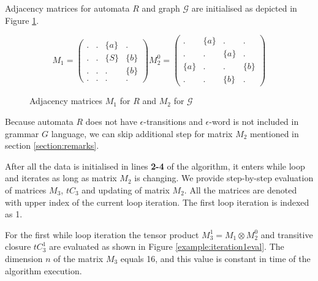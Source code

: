 Adjacency matrices for automata $R$ and graph $\mathcal{G}$ are initialised as depicted in Figure \ref{example:init}.

\begin{figure}
    \centering
    $$
    M_1 =
    \begin{pmatrix}
    . & . & \{a\} & .     \\
    . & . & \{S\} & \{b\} \\
    . & . & . & \{b\}     \\
    . & . & . & . 
    \end{pmatrix}
    M_2^0 =
    \begin{pmatrix}
    . & \{a\} & . & .     \\
    . & . & \{a\} & .     \\
    \{a\} & . & . & \{b\} \\
    . & . & \{b\} & . 
    \end{pmatrix}
    $$
    \caption{Adjacency matrices $M_1$ for $R$ and $M_2$ for $\mathcal{G}$}
    \label{example:init}
\end{figure}

Because automata $R$ does not have $\epsilon$-transitions and $\epsilon$-word is not included in grammar $G$ language, we can skip additional step for matrix $M_2$ mentioned in section \ref{section:remarks}.

After all the data is initialised in lines \textbf{2-4} of the algorithm, it enters while loop and iterates as long as matrix $M_2$ is changing. We provide step-by-step evaluation of matrices $M_3$, $tC_3$ and updating of matrix $M_2$. All the matrices are denoted with upper index of the current loop iteration. The first loop iteration is indexed as 1.
    
For the first while loop iteration the tensor product $M_3^1 = M_1 \otimes M_2^0$ and transitive closure $tC_3^1$ are evaluated as shown in Figure \ref{example:iteration1eval}. The dimension $n$ of the matrix $M_3$ equals 16, and this value is constant in time of the algorithm execution. 
    
